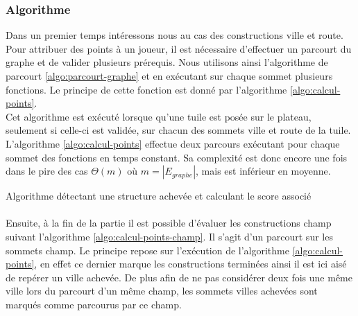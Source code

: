 \documentclass[a4paper, 11pt]{article}
\begin{document}
		\subsubsection{Algorithme}\label{sec:calcul-points-algo}
			\indent Dans un premier temps intéressons nous au cas des constructions ville et route. Pour attribuer des points à un joueur, il est nécessaire d'effectuer un parcourt du graphe et de valider plusieurs prérequis. Nous utilisons ainsi l'algorithme de parcourt \ref{algo:parcourt-graphe} et en exécutant sur chaque sommet plusieurs fonctions. Le principe de cette fonction est donné par l'algorithme \ref{algo:calcul-points}.\\
			\indent Cet algorithme est exécuté lorsque qu'une tuile est posée sur le plateau, seulement si celle-ci est validée, sur chacun des sommets ville et route de la tuile. L'algorithme \ref{algo:calcul-points} effectue deux parcours exécutant pour chaque sommet des fonctions en temps constant. Sa complexité est donc encore une fois dans le pire des cas $\Theta(m)$ où $m=|E_{graphe}|$, mais est inférieur en moyenne. \\

			\begin{algorithm}[H]
			  \BlankLine
			  \caption{Algorithme détectant une structure achevée et calculant le score associé}
			  \label{algo:calcul-points}
			\end{algorithm}

			\paragraph{}
			\indent Ensuite, à la fin de la partie il est possible d'évaluer les constructions champ suivant l'algorithme \ref{algo:calcul-points-champ}. Il s'agit d'un parcourt sur les sommets champ. Le principe repose sur l'exécution de l'algorithme \ref{algo:calcul-points}, en effet ce dernier marque les constructions terminées ainsi il est ici aisé de repérer un ville achevée. De plus afin de ne pas considérer deux fois une même ville lors du parcourt d'un même champ, les sommets villes achevées sont marqués comme parcourus par ce champ. \\
\end{document}
